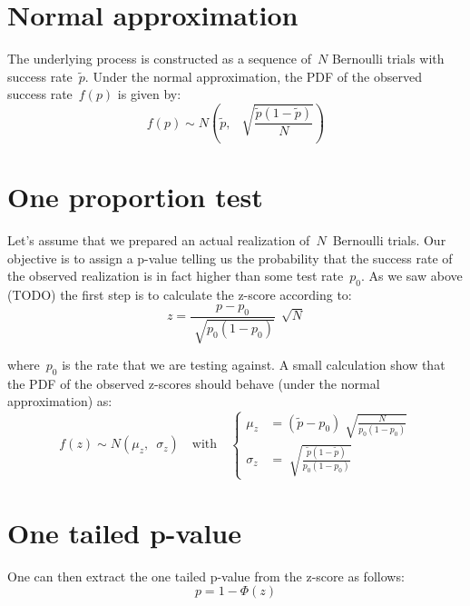 \documentclass{article}
\begin{document}
\section{Normal approximation}

The underlying process is constructed as a sequence of~$N$ Bernoulli trials with success rate~$\tilde{p}$. Under the normal approximation, the PDF of the observed success rate~$f(p)$ is given by:
\begin{equation}
f(p) \sim N \left( \tilde{p}, \,\,\, \sqrt[]{\frac{\tilde{p} (1 - \tilde{p})}{N}} \right)
\end{equation}

\section{One proportion test}

Let's assume that we prepared an actual realization of~$N$~Bernoulli trials.  Our objective is to assign a p-value telling us the probability that the success rate of the observed realization is in fact higher than some test rate~$p_0$. As we saw above (TODO) the first step is to calculate the z-score according to:
\begin{equation}
z = \frac{p - p_0}{\sqrt[]{p_0 (1 - p_0)}} \, \sqrt[]{N}
\end{equation}

\noindent where~$p_0$ is the rate that we are testing against.  A small calculation show that the PDF of the observed z-scores should behave (under the normal approximation) as:
\begin{equation}
f(z) \sim N \left( \mu_z , \,\,\, \sigma_z \right) \quad \mbox{with} \quad 
\begin{cases}
    \mu_z  & = \left( \tilde{p}  - p_0 \right) \sqrt[]{\frac{N}{p_0 (1 - p_0)}} \\
    \sigma_z & = \sqrt[]{\frac{\tilde{p} (1 - \tilde{p})}{p_0 (1 - p_0) }}
  \end{cases}
\end{equation}

\section{One tailed p-value}

One can then extract the one tailed p-value from the z-score as follows:
\begin{equation}
p = 1 - \Phi \left( z \right)
\end{equation}
\end{document}
